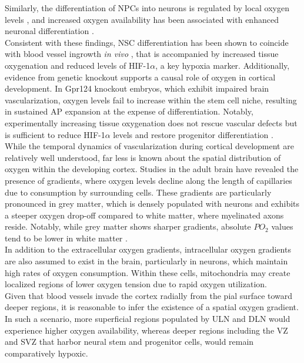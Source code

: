 Similarly, the differentiation of NPCs into neurons is regulated by local oxygen levels \citep{malikNeurogenesisContinuesThird2013},  and increased oxygen availability has been associated with enhanced neuronal differentiation \citep{STORCHFunctionalCharacterizationDopaminergic2003,STUDEREnhancedProliferationSurvival2000,SANTILLIMildHypoxiaEnhances2010}.
\\

Consistent with these findings, NSC differentiation has been shown to coincide with blood vessel ingrowth \textit{in vivo} \citep{SHENEndothelialCellsStimulate2004},  
that is accompanied by increased tissue oxygenation and reduced levels of HIF-1$\alpha$, a key hypoxia marker. Additionally, evidence from genetic knockout supports a causal role of oxygen in cortical development. 
In Gpr124 knockout embryos, which exhibit impaired brain vascularization, oxygen levels fail to increase within the stem cell niche, resulting in sustained AP expansion at the expense of differentiation. Notably, experimentally increasing tissue oxygenation does not rescue vascular defects but is sufficient to reduce HIF-1$\alpha$ levels and restore progenitor differentiation \citep{LANGEReliefHypoxiaAngiogenesis2016}.
\\

While the temporal dynamics of vascularization during cortical development are relatively well understood, far less is known about the spatial distribution of oxygen within the developing cortex. Studies in the adult brain have revealed the presence of gradients, where oxygen levels decline along the length of capillaries due to consumption by surrounding cells. These gradients are particularly pronounced in grey matter, which is densely populated with neurons and exhibits a steeper oxygen drop-off compared to white matter, where myelinated axons reside. Notably, while grey matter shows sharper gradients, absolute $PO_2$
values tend to be lower in white matter \citep{erecinskaTissueOxygenTension2001}.
\\

In addition to the extracellular oxygen gradients, intracellular oxygen gradients are also assumed to exist in the brain, particularly in neurons, which maintain high rates of oxygen consumption. Within these cells, mitochondria may create localized regions of lower oxygen tension due to rapid oxygen utilization.
\\

Given that blood vessels invade the cortex radially from the pial surface toward deeper regions, it is reasonable to infer the existence of a spatial oxygen gradient. In such a scenario, more superficial regions populated by ULN and DLN would experience higher oxygen availability, whereas deeper regions including the VZ and SVZ that harbor neural stem and progenitor cells, would remain comparatively hypoxic. 
